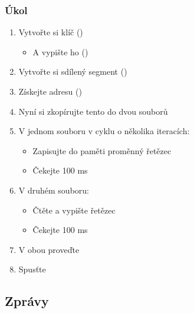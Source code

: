 \begin{frame}
  \frametitle{Úkol}

  \begin{enumerate}
    \item Vytvořte si klíč ()
    \begin{itemize}
      \item A vypište ho ()
    \end{itemize}
    \item Vytvořte si sdílený segment ()
    \item Získejte adresu ()
    \item Nyní si zkopírujte tento  do dvou souborů
    \item V jednom souboru v cyklu o několika iteracích:
    \begin{itemize}
      \item Zapisujte do paměti proměnný řetězec
      \item Čekejte 100 ms
    \end{itemize}

    \item V druhém souboru:
    \begin{itemize}
      \item Čtěte a vypište řetězec
      \item Čekejte 100 ms
    \end{itemize}

    \item V obou proveďte 
    \item Spusťte
  \end{enumerate}

\end{frame}

\iffimuni
\subsection{Zprávy}
\fi

